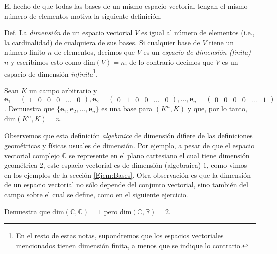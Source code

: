 \documentclass[notasLineal]{subfiles}
\begin{document}
El hecho de que todas las bases de un mismo espacio vectorial tengan el mismo número de elementos motiva la siguiente definición.

\begin{tcolorbox}

    \underline{Def.} La \emph{dimensión} de un espacio vectorial $V$ es igual al número de elementos (i.e., la cardinalidad) de cualquiera de sus bases. Si cualquier base de $V$ tiene un número finito $n$ de elementos, decimos que $V$ es un \emph{espacio de dimensión (finita)} $n$ y escribimos esto como $\text{dim}(V)=n$; de lo contrario decimos que $V$ es un espacio de dimensión \emph{infinita}\footnote{En el resto de estas notas, supondremos que los espacios vectoriales mencionados tienen dimensión finita, a menos que se indique lo contrario.}.

\end{tcolorbox}

\begin{Ejer}
    Sean $K$ un campo arbitrario y $\mathbf{e}_1=\begin{pmatrix} 1 & 0 & 0 & 0 & ... & 0 \end{pmatrix}, \mathbf{e}_2=\begin{pmatrix} 0 & 1 & 0 & 0 & ... & 0 \end{pmatrix}, ..., \mathbf{e}_n = \begin{pmatrix} 0 & 0 & 0 & 0 & ... & 1 \end{pmatrix}$. Demuestra que $\{\mathbf{e}_1, \mathbf{e}_2, ..., \mathbf{e}_n\}$ es una base para $(K^n,K)$ y que, por lo tanto, $\text{dim}(K^n,K)=n$.
\end{Ejer}

Observemos que esta definición \emph{algebraica} de dimensión difiere de las definiciones geométricas y físicas usuales de dimensión. Por ejemplo, a pesar de que el espacio vectorial complejo $\mathbb{C}$ se represente en el plano cartesiano \textemdash el cual tiene dimensión geométrica $2$\textemdash\hspace{0.5mm}, este espacio vectorial es de dimensión (algebraica) $1$, como vimos en los ejemplos de la sección \ref{Ejem:Bases}. Otra observación es que la dimensión de un espacio vectorial no sólo depende del conjunto vectorial, sino también del campo sobre el cual se define, como en el siguiente ejercicio.

\begin{Ejer}
    Demuestra que $\text{dim}(\mathbb{C},\mathbb{C})=1$ pero $\text{dim}(\mathbb{C},\mathbb{R})=2$.
\end{Ejer}
\end{document}
